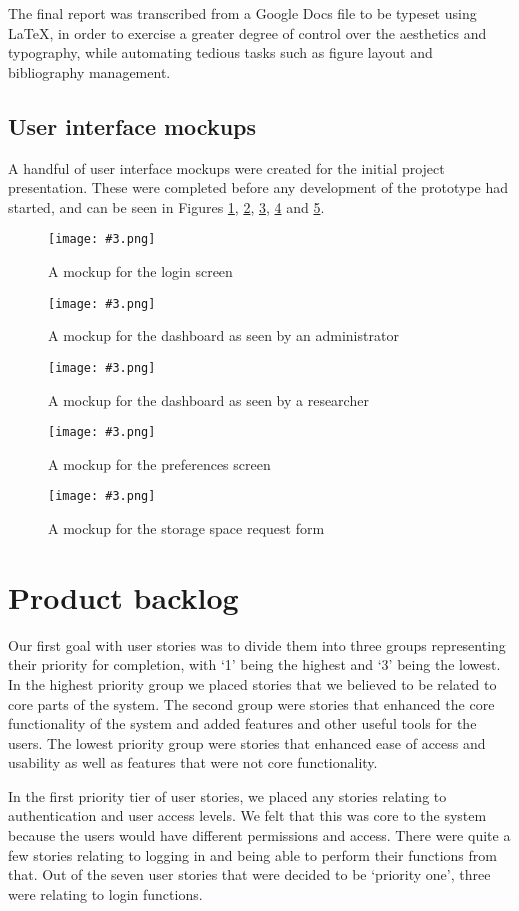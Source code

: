 \documentclass[a4paper,titlepage,12pt]{article}
\let\stdsection\section
\renewcommand\section{\newpage\stdsection}
\newcommand\figimg[4][\textwidth]{
	\begin{figure}
		\caption{#4}
		\label{fig:#2}
		\texttt{[image: \#3.png]}
	\end{figure}
}
\begin{document}
The final report was transcribed from a Google Docs file to be typeset using
\LaTeX, in order to exercise a greater degree of control over the aesthetics
and typography, while automating tedious tasks such as figure layout and
bibliography management.

\newpage

\subsection{User interface mockups}

A handful of user interface mockups were created for the initial project
presentation. These were completed before any development of the prototype had
started, and can be seen in Figures \ref{fig:login-mockup},
\ref{fig:admin-mockup}, \ref{fig:researcher-mockup},
\ref{fig:preferences-mockup} and \ref{fig:request-mockup}.

\figimg{login-mockup}{../mockups/login}
	{A mockup for the login screen}

\figimg{admin-mockup}{../mockups/admin}
	{A mockup for the dashboard as seen by an administrator}

\figimg{researcher-mockup}{../mockups/researcher}
	{A mockup for the dashboard as seen by a researcher}

\figimg{preferences-mockup}{../mockups/preferences}
	{A mockup for the preferences screen}

\figimg{request-mockup}{../mockups/request}
	{A mockup for the storage space request form}

\section{Product backlog}

Our first goal with user stories was to divide them into three groups
representing their priority for completion, with `1' being the highest and `3'
being the lowest. In the highest priority group we placed stories that we
believed to be related to core parts of the system. The second group were
stories that enhanced the core functionality of the system and added features
and other useful tools for the users. The lowest priority group were stories
that enhanced ease of access and usability as well as features that were not
core functionality.

In the first priority tier of user stories, we placed any stories relating to
authentication and user access levels. We felt that this was core to the system
because the users would have different permissions and access. There were quite
a few stories relating to logging in and being able to perform their functions
from that. Out of the seven user stories that were decided to be `priority
one', three were relating to login functions.
\end{document}
